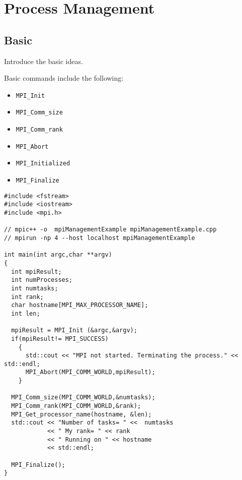 \chapter{Process Management}

\section{Basic}

Introduce the basic ideas.

Basic commands include the following: \\
\begin{itemize}
\item \texttt{MPI\_Init}
\item \texttt{MPI\_Comm\_size}
\item \texttt{MPI\_Comm\_rank}
\item \texttt{MPI\_Abort}
\item \texttt{MPI\_Initialized}
\item \texttt{MPI\_Finalize}
\end{itemize}



\lstset{language=C++, numbers=left, numberstyle=\tiny, stepnumber=1,
  numbersep=5pt, commentstyle=\scriptsize}
\begin{lstlisting}[caption={Basic Process Information},
                   basicstyle=\scriptsize,
                   label=listing:touch]
#include <fstream>
#include <iostream>
#include <mpi.h>

// mpic++ -o  mpiManagementExample mpiManagementExample.cpp 
// mpirun -np 4 --host localhost mpiManagementExample

int main(int argc,char **argv)
{
  int mpiResult;
  int numProcesses;
  int numtasks;
  int rank;
  char hostname[MPI_MAX_PROCESSOR_NAME];
  int len;

  mpiResult = MPI_Init (&argc,&argv);
  if(mpiResult!= MPI_SUCCESS)
    {
      std::cout << "MPI not started. Terminating the process." << std::endl;
      MPI_Abort(MPI_COMM_WORLD,mpiResult);
    }

  MPI_Comm_size(MPI_COMM_WORLD,&numtasks);
  MPI_Comm_rank(MPI_COMM_WORLD,&rank);
  MPI_Get_processor_name(hostname, &len);
  std::cout << "Number of tasks= " <<  numtasks
            << " My rank= " << rank
            << " Running on " << hostname
            << std::endl;

  MPI_Finalize();
}
\end{lstlisting}


